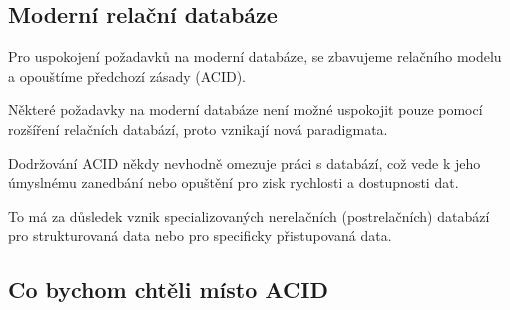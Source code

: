 \subsection{Moderní relační databáze}

\begin{compactitem}
    \item Pro uspokojení požadavků na moderní databáze, se zbavujeme relačního modelu a opouštíme předchozí zásady (ACID).

    \item Některé požadavky na moderní databáze není možné uspokojit pouze pomocí rozšíření relačních databází, proto vznikají nová paradigmata.

    \item Dodržování ACID někdy nevhodně omezuje práci s databází, což vede k jeho úmyslnému zanedbání nebo opuštění pro zisk rychlosti a dostupnosti dat.

    \item To má za důsledek vznik specializovaných nerelačních (postrelačních) databází pro strukturovaná data nebo pro specificky přistupovaná data.
\end{compactitem}

\subsection{Co bychom chtěli místo ACID}

